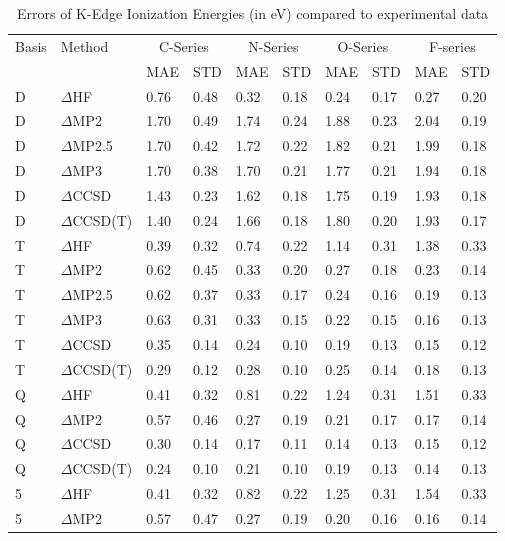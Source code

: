 \begin{table}
  \caption{Errors of K-Edge Ionization Energies (in eV) compared to experimental data}
  \label{tbl:summary-series-wide}
  \begin{tabular}{l l l l l l l l l l }
    \toprule
    Basis & Method & \multicolumn{2}{c}{C-Series} & \multicolumn{2}{c}{N-Series} & \multicolumn{2}{c}{O-Series} & \multicolumn{2}{c}{F-series} \\ 
     &  & MAE & STD & MAE & STD & MAE & STD & MAE & STD \\ 
    \midrule
    D & $\Delta$HF & 0.76 & 0.48 & 0.32 & 0.18 & 0.24 & 0.17 & 0.27 & 0.20 \\ 
    D & $\Delta$MP2 & 1.70 & 0.49 & 1.74 & 0.24 & 1.88 & 0.23 & 2.04 & 0.19 \\ 
    D & $\Delta$MP2.5 & 1.70 & 0.42 & 1.72 & 0.22 & 1.82 & 0.21 & 1.99 & 0.18 \\ 
    D & $\Delta$MP3 & 1.70 & 0.38 & 1.70 & 0.21 & 1.77 & 0.21 & 1.94 & 0.18 \\ 
    D & $\Delta$CCSD & 1.43 & 0.23 & 1.62 & 0.18 & 1.75 & 0.19 & 1.93 & 0.18 \\ 
    D & $\Delta$CCSD(T) & 1.40 & 0.24 & 1.66 & 0.18 & 1.80 & 0.20 & 1.93 & 0.17 \\ 
    T & $\Delta$HF & 0.39 & 0.32 & 0.74 & 0.22 & 1.14 & 0.31 & 1.38 & 0.33 \\ 
    T & $\Delta$MP2 & 0.62 & 0.45 & 0.33 & 0.20 & 0.27 & 0.18 & 0.23 & 0.14 \\ 
    T & $\Delta$MP2.5 & 0.62 & 0.37 & 0.33 & 0.17 & 0.24 & 0.16 & 0.19 & 0.13 \\ 
    T & $\Delta$MP3 & 0.63 & 0.31 & 0.33 & 0.15 & 0.22 & 0.15 & 0.16 & 0.13 \\ 
    T & $\Delta$CCSD & 0.35 & 0.14 & 0.24 & 0.10 & 0.19 & 0.13 & 0.15 & 0.12 \\ 
    T & $\Delta$CCSD(T) & 0.29 & 0.12 & 0.28 & 0.10 & 0.25 & 0.14 & 0.18 & 0.13 \\ 
    Q & $\Delta$HF & 0.41 & 0.32 & 0.81 & 0.22 & 1.24 & 0.31 & 1.51 & 0.33 \\ 
    Q & $\Delta$MP2 & 0.57 & 0.46 & 0.27 & 0.19 & 0.21 & 0.17 & 0.17 & 0.14 \\ 
    Q & $\Delta$CCSD & 0.30 & 0.14 & 0.17 & 0.11 & 0.14 & 0.13 & 0.15 & 0.12 \\ 
    Q & $\Delta$CCSD(T) & 0.24 & 0.10 & 0.21 & 0.10 & 0.19 & 0.13 & 0.14 & 0.13 \\ 
    5 & $\Delta$HF & 0.41 & 0.32 & 0.82 & 0.22 & 1.25 & 0.31 & 1.54 & 0.33 \\ 
    5 & $\Delta$MP2 & 0.57 & 0.47 & 0.27 & 0.19 & 0.20 & 0.16 & 0.16 & 0.14 \\ 
    \bottomrule
  \end{tabular}
\end{table}
